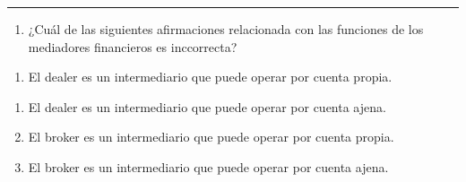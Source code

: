 \documentclass[
  letterpaper,
  DIV=11,
  numbers=noendperiod]{scrreprt}
\providecommand{\tightlist}{%
  \setlength{\itemsep}{0pt}\setlength{\parskip}{0pt}}\usepackage{longtable,booktabs,array}
\begin{document}
\begin{center}\rule{0.5\linewidth}{0.5pt}\end{center}

\begin{enumerate}
\def\labelenumi{\arabic{enumi}.}
\setcounter{enumi}{6}
\tightlist
\item
  ¿Cuál de las siguientes afirmaciones relacionada con las funciones de
  los mediadores financieros es inccorrecta?
\end{enumerate}

\begin{enumerate}
\def\labelenumi{\alph{enumi})}
\tightlist
\item
  El dealer es un intermediario que puede operar por cuenta propia.
\end{enumerate}

\begin{enumerate}
\def\labelenumi{\alph{enumi}.}
\setcounter{enumi}{1}
\item
  El dealer es un intermediario que puede operar por cuenta ajena.
\item
  El broker es un intermediario que puede operar por cuenta propia.
\item
  El broker es un intermediario que puede operar por cuenta ajena.
\end{enumerate}
\end{document}
